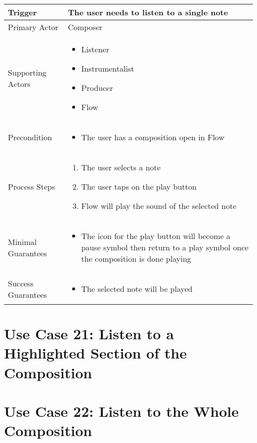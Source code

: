   \begin{tabularx}{\textwidth}{|X|X|}
  \hline
  Trigger & 
  The user needs to listen to a single note \\
  \hline
  Primary Actor & 
  Composer \\
  \hline
  Supporting Actors & 
  \begin{itemize}
  \item Listener
  \item Instrumentalist
  \item Producer
  \item Flow
  \end{itemize} \\
  \hline
  Precondition & 
  \begin{itemize}
  \item The user has a composition open in Flow
  \end{itemize} \\
  \hline
  Process Steps & 
  \begin{enumerate}
  \item The user selects a note
  \item The user taps on the play button
  \item Flow will play the sound of the selected note
  \end{enumerate} \\
  \hline
  Minimal Guarantees & 
  \begin{itemize}
   \item The icon for the play button will become a pause symbol then return to a play symbol once the composition is done playing
  \end{itemize} \\
  \hline
  Success Guarantees & 
  \begin{itemize}
    \item The selected note will be played
  \end{itemize} \\
  \hline
  \end{tabularx}

  \section{Use Case 21: Listen to a Highlighted Section of the Composition}


  \section{Use Case 22: Listen to the Whole Composition}

